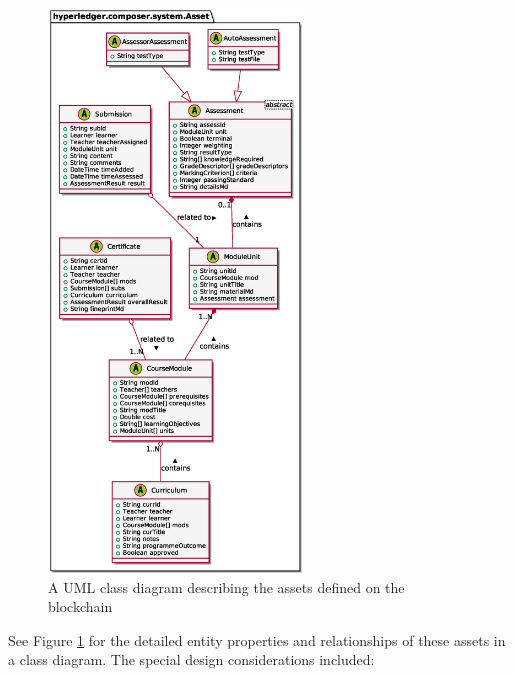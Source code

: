 \begin{figure}[!ht] 
    \centering    
    \includegraphics[width=0.6\textwidth]{assets}
    \caption[Assets Class Diagram]
        {A UML class diagram describing the assets defined on the blockchain} 
    \label{fig:assets}
\end{figure}

See Figure \ref{fig:assets} for the detailed entity properties and relationships of these assets 
in a class diagram. The special design considerations included:

